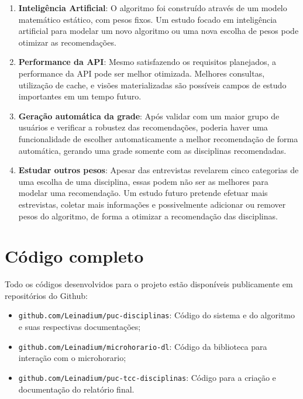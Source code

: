 \begin{enumerate}
    \item \textbf{Inteligência Artificial}: O algoritmo foi construído através de um modelo matemático estático, com pesos fixos. Um estudo focado em inteligência artificial para modelar um novo algoritmo ou uma nova escolha de pesos pode otimizar as recomendações.
    
    \item \textbf{Performance da API}: Mesmo satisfazendo os requisitos planejados, a performance da API pode ser melhor otimizada. Melhores consultas, utilização de cache, e visões materializadas são possíveis campos de estudo importantes em um tempo futuro.
    
    \item \textbf{Geração automática da grade}: Após validar com um maior grupo de usuários e verificar a robustez das recomendações, poderia haver uma funcionalidade de escolher automaticamente a melhor recomendação de forma automática, gerando uma grade somente com as disciplinas recomendadas.
    
    \item \textbf{Estudar outros pesos}: Apesar das entrevistas revelarem cinco categorias de uma escolha de uma disciplina, essas podem não ser as melhores para modelar uma recomendação. Um estudo futuro pretende efetuar mais estrevistas, coletar mais informações e possivelmente adicionar ou remover pesos do algoritmo, de forma a otimizar a recomendação das disciplinas.
\end{enumerate}

\section{Código completo}


Todo os códigos desenvolvidos para o projeto estão disponíveis publicamente em repositórios do Github:

\begin{itemize}
    \item \verb|github.com/Leinadium/puc-disciplinas|: Código do sistema e do algoritmo e suas respectivas documentações;
    \item \verb|github.com/Leinadium/microhorario-dl|: Código da biblioteca para interação com o microhorario;
    \item \verb|github.com/Leinadium/puc-tcc-disciplinas|: Código para a criação e documentação do relatório final.
\end{itemize}